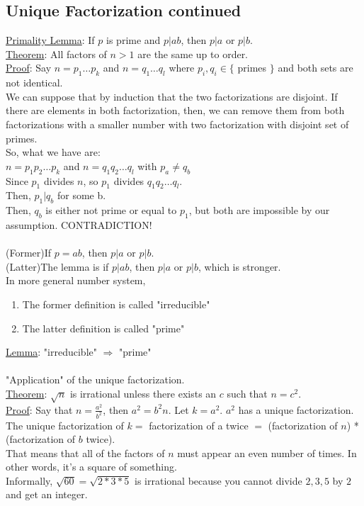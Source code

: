 \documentclass[13pt]{article}
\begin{document}
	\subsection*{Unique Factorization continued}
	\underline{Primality Lemma}: If $p$ is prime and $p | ab$, then $p | a$ 
	or $p | b$.\\
	\underline{Theorem}: All factors of $n > 1$ are the same up to order.\\
	\underline{Proof}: Say $n = p_1\ldots p_k$ and $n = q_1\dots q_l$ where
	$p_i,q_i \in \{$ primes $\}$ and both sets are not identical.\\
	We can suppose that by induction that the two factorizations are disjoint.
	If there are elements in both factorization, then, we can remove them
	from both factorizations with a smaller number with two factorization
	with disjoint set of primes. \\
	So, what we have are:\\
	$n = p_1p_2 \ldots p_k$ and $n = q_1q_2 \ldots q_l$ with $p_a \not= q_b$\\
	Since $p_1$ divides $n$, so $p_1$ divides $q_1q_2 \ldots q_l$.\\
	Then, $p_1 | q_b$ for some b.\\
	Then, $q_b$ is either not prime or equal to $p_1$, but both are impossible
	by our assumption. CONTRADICTION!\\\\
	(Former)If $p = ab$, then $p|a$ or $p|b$. \\
	(Latter)The lemma is if $p | ab$, then $p|a$ or $p|b$, which is stronger.\\
	In more general number system,
	\begin{enumerate}
		\item The former definition is called "irreducible"
		\item The latter definition is called "prime"
	\end{enumerate}
	\underline{Lemma}: "irreducible" $\Rightarrow$ "prime" \\\\
	"Application" of the unique factorization.\\
	\underline{Theorem}: $\sqrt{n}$ is irrational unless there exists an $c$ 
	such that $n = c^2$.\\
	\underline{Proof}: Say that $n= \frac{a^2}{b^2}$, then $a^2 = b^2n$. Let
	$k = a^2$. $a^2$ has a unique factorization. The unique factorization of 
	$k = $ factorization of a twice $ = $ (factorization of $n$) * 
	(factorization of $b$ twice). \\
	That means that all of the factors of $n$	must appear an even number of 
	times. In other words, it's a square of something. \\
	Informally, $\sqrt{60} = \sqrt{2 * 3 * 5}$ is irrational because you cannot
	divide $2, 3, 5$ by $2$ and get an integer.
\end{document}
